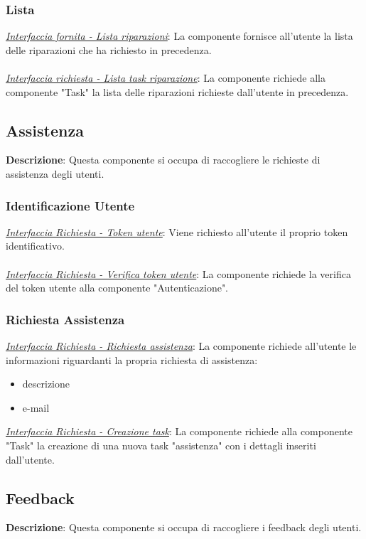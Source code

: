 \documentclass{report}
\begin{document}
\subsubsection*{\indent \indent Lista}
\uline{\textit{Interfaccia fornita - Lista riparazioni}}: %
La componente fornisce all'utente la lista delle riparazioni che ha richiesto in precedenza.\\\\
\uline{\textit{Interfaccia richiesta - Lista task riparazione}}: 
La componente richiede alla componente "Task" la lista delle riparazioni richieste dall'utente in precedenza.

\subsection*{Assistenza}
\textbf{Descrizione}: Questa componente si occupa di raccogliere le richieste di assistenza degli utenti.
\subsubsection*{\indent \indent Identificazione Utente}
\uline{\textit{Interfaccia Richiesta - Token utente}}: 
Viene richiesto all'utente il proprio token identificativo.\\\\
\uline{\textit{Interfaccia Richiesta - Verifica token utente}}:
La componente richiede la verifica del token utente alla componente "Autenticazione".
\subsubsection*{\indent \indent Richiesta Assistenza}
\uline{\textit{Interfaccia Richiesta - Richiesta assistenza}}:
La componente richiede all'utente le informazioni riguardanti la propria richiesta di assistenza:
\begin{itemize}
	\item descrizione
	\item e-mail
\end{itemize}
\uline{\textit{Interfaccia Richiesta - Creazione task}}:
La componente richiede alla componente "Task" la creazione di una nuova task "assistenza" con i dettagli inseriti dall'utente.

\subsection*{Feedback}
\textbf{Descrizione}: Questa componente si occupa di raccogliere i feedback degli utenti.
\end{document}
